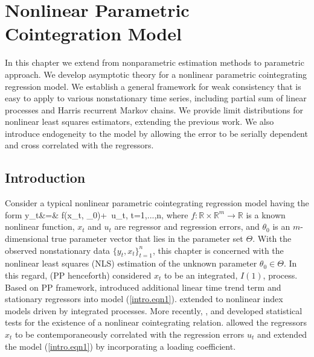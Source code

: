 
\chapter{Nonlinear Parametric Cointegration Model} 
\ifpdf
    \graphicspath{{Chapter6/Chapter6Figs/PNG/}{Chapter6/Chapter6Figs/PDF/}{Chapter6/Chapter6Figs/}}
\else
    \graphicspath{{Chapter6/Chapter6Figs/EPS/}{Chapter6/Chapter6Figs/}}
\fi

 In this chapter we extend from nonparametric estimation methods to parametric approach. We develop asymptotic theory for a nonlinear parametric cointegrating regression model. We establish a general framework for  weak consistency that is easy to apply to various nonstationary time series, including partial sum of linear processes and  Harris recurrent Markov chains. We provide  limit distributions for  nonlinear least squares  estimators,    extending the previous work.  We also introduce endogeneity to the model by allowing the error to be serially dependent and cross correlated with the regressors.



\section{Introduction} 
Consider a typical nonlinear parametric cointegrating regression model having the form
 \be y_t&=&
f(x_t, \theta_0)+\,  u_t, \quad t=1,...,n,
\ee
where  $f:\mathbb{R} \times \mathbb{R}^m \rightarrow \mathbb{R}$ is a known nonlinear function,
$x_t$ and  $u_t$ are regressor and regression errors, and   $\theta_0$ is an $m$-dimensional true parameter vector that lies in the parameter set $\Theta$. With the observed nonstationary data $\{y_t, x_t\}_{t=1}^n$, this chapter is concerned with the nonlinear least squares (NLS) estimation of the unknown parameter $\theta_0 \in \Theta$. In this regard, \cite{parkphillips2001} (PP henceforth) considered $x_t$ to be an integrated, $I(1)$, process. Based on PP framework, \cite{changparkphillips2001} introduced additional linear time trend term and stationary regressors into model (\ref{intro.eqn1}). \cite{changpark2003} extended to nonlinear index models driven by integrated processes.  More recently, \cite{choisaikkonen2010}, \cite{gaomaxwelllutjostheim2009b} and \cite{wangphillips2012} developed statistical tests  for the existence of a nonlinear cointegrating relation. \cite{changpark2010} allowed the regressors $x_t$ to be contemporaneously correlated with the regression errors $u_t$ and \cite{shiphillips2010} extended the model (\ref{intro.eqn1}) by incorporating a loading coefficient.


